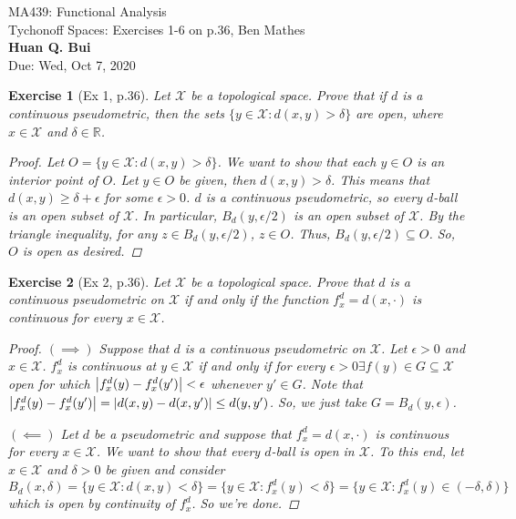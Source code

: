 \documentclass[11pt]{article}
\newtheorem{exercise}{Exercise}
\newcommand{\R}{\mathbb{R}}
\newcommand{\X}{\mathcal{X}}
\begin{document}
\begin{center}
\begin{framed}
{\Large  MA439: Functional Analysis\\
	 Tychonoff Spaces:  Exercises 1-6 on p.36, Ben Mathes}\\
$\,$\\
{\Large \bf  Huan Q. Bui\\}
$\,$\\
{\Large Due: Wed, Oct 7, 2020}
\end{framed}
\end{center}

\begin{exercise}[Ex 1, p.36]
	Let $\X$ be a topological space. Prove that if $d$ is a continuous pseudometric, then the sets $\{ y \in \X : d(x,y) > \delta \}$ are open, where $x\in \X$ and $\delta \in \R$.  
	\begin{proof}
		Let $O = \{ y \in \X : d(x,y) > \delta \}$. We want to show that each $y\in O$ is an interior point of $O$. Let $y\in O$ be given, then $d(x,y) > \delta$. This means that $d(x,y) \geq \delta + \epsilon$ for some $\epsilon > 0$. $d$ is a continuous pseudometric, so every $d$-ball is an open subset of $\X$. In particular, $B_d(y,\epsilon/2)$ is an open subset of $\X$. By the triangle inequality, for any $z\in B_d(y,\epsilon/2)$, $z\in O$. Thus, $B_d(y,\epsilon/2) \subseteq O$. So, $O$ is open as desired.  
 	\end{proof}
\end{exercise}

\begin{exercise}[Ex 2, p.36]
	Let $\X$ be a topological space. Prove that $d$ is a continuous pseudometric on $\X$ if and only if the function $f_x^d = d(x,\cdot)$ is continuous for every $x\in \X$.
	\begin{proof}
		$(\implies)$ Suppose that $d$ is a continuous pseudometric on $\X$. Let $\epsilon > 0$ and $x\in \X$. $f^d_x$ is continuous at $y\in \X$ if and only if for every $\epsilon > 0 \exists f(y) \in G\subseteq \X$ open for which $\abs{f_x^d(y) - f^d_x(y')} < \epsilon$ whenever $y'\in G$. Note that $\abs{f^d_x(y) - f^d_x(y')} = \abs{d(x,y) - d(x,y')} \leq d(y,y')$. So, we just take $G = B_d(y,\epsilon)$. 
		
		$(\impliedby)$ Let $d$ be a pseudometric and suppose that $f_x^d = d(x,\cdot)$ is continuous for every $x\in \X$. We want to show that every $d$-ball is open in $\X$. To this end, let $x\in \X$ and $\delta > 0$ be given and consider $B_d(x,\delta) = \{ y\in \X : d(x,y) < \delta  \} = \{ y\in \X : f_x^d(y) < \delta \} = \{ y\in \X : f_x^d(y) \in (-\delta,\delta) \}$ which is open by continuity of $f_x^d$. So we're done.  
	\end{proof}
\end{exercise}
\end{document}
